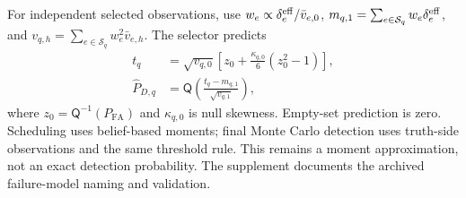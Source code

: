 For independent selected observations, use
$w_e\propto\delta_e^{\rm eff}/\bar v_{e,0}$,
$m_{q,1}=\sum_{e\in\mathcal S_q}w_e\delta_e^{\rm eff}$, and
$v_{q,h}=\sum_{e\in\mathcal S_q}w_e^2\bar v_{e,h}$. The selector predicts
\begin{equation}
\begin{aligned}
 t_q&=\sqrt{v_{q,0}}\left[z_0+\frac{\kappa_{q,0}}6(z_0^2-1)\right],\\
 \widehat P_{D,q}&=\mathsf Q\!\left(\frac{t_q-m_{q,1}}{\sqrt{v_{q,1}}}\right),
\end{aligned}
 \label{eq:detector_prediction}
\end{equation}
where $z_0=\mathsf Q^{-1}(P_{\mathrm{FA}})$ and $\kappa_{q,0}$ is null skewness.
Empty-set prediction is zero. Scheduling uses belief-based moments; final
Monte Carlo detection uses truth-side observations and the same threshold
rule. This remains a moment approximation, not an exact detection probability.
The supplement documents the archived failure-model naming and validation.

